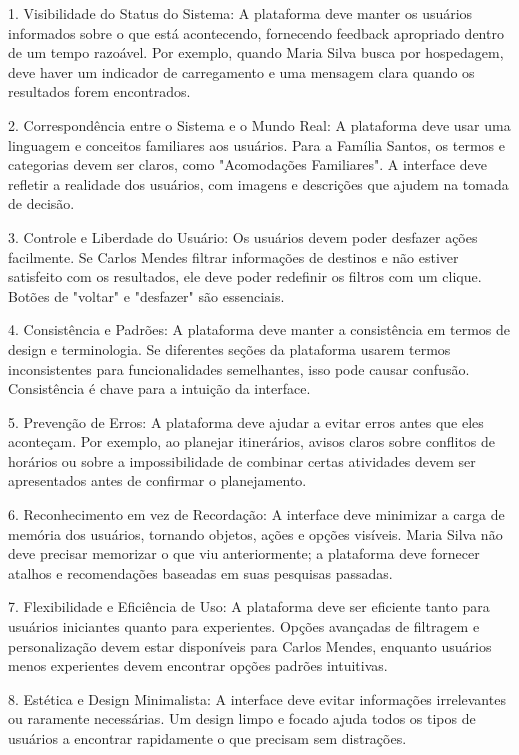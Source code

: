 \documentclass{article}
\begin{document}
1. Visibilidade do Status do Sistema: A plataforma deve manter os usuários informados sobre o que está acontecendo, fornecendo feedback apropriado dentro de um tempo razoável. Por exemplo, quando Maria Silva busca por hospedagem, deve haver um indicador de carregamento e uma mensagem clara quando os resultados forem encontrados.

2. Correspondência entre o Sistema e o Mundo Real: A plataforma deve usar uma linguagem e conceitos familiares aos usuários. Para a Família Santos, os termos e categorias devem ser claros, como "Acomodações Familiares". A interface deve refletir a realidade dos usuários, com imagens e descrições que ajudem na tomada de decisão.

3. Controle e Liberdade do Usuário: Os usuários devem poder desfazer ações facilmente. Se Carlos Mendes filtrar informações de destinos e não estiver satisfeito com os resultados, ele deve poder redefinir os filtros com um clique. Botões de "voltar" e "desfazer" são essenciais.

4. Consistência e Padrões: A plataforma deve manter a consistência em termos de design e terminologia. Se diferentes seções da plataforma usarem termos inconsistentes para funcionalidades semelhantes, isso pode causar confusão. Consistência é chave para a intuição da interface.

5. Prevenção de Erros: A plataforma deve ajudar a evitar erros antes que eles aconteçam. Por exemplo, ao planejar itinerários, avisos claros sobre conflitos de horários ou sobre a impossibilidade de combinar certas atividades devem ser apresentados antes de confirmar o planejamento.

6. Reconhecimento em vez de Recordação: A interface deve minimizar a carga de memória dos usuários, tornando objetos, ações e opções visíveis. Maria Silva não deve precisar memorizar o que viu anteriormente; a plataforma deve fornecer atalhos e recomendações baseadas em suas pesquisas passadas.

7. Flexibilidade e Eficiência de Uso: A plataforma deve ser eficiente tanto para usuários iniciantes quanto para experientes. Opções avançadas de filtragem e personalização devem estar disponíveis para Carlos Mendes, enquanto usuários menos experientes devem encontrar opções padrões intuitivas.

8. Estética e Design Minimalista: A interface deve evitar informações irrelevantes ou raramente necessárias. Um design limpo e focado ajuda todos os tipos de usuários a encontrar rapidamente o que precisam sem distrações.
\end{document}

